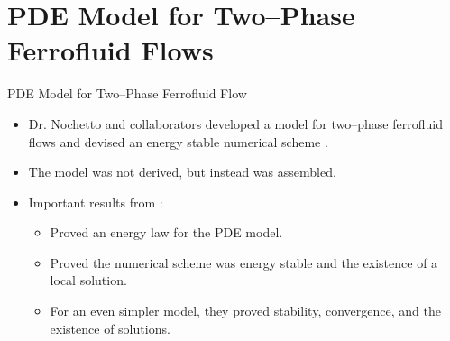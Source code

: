 \documentclass[9pt]{beamer}
\begin{document}
\section{PDE Model for Two--Phase Ferrofluid Flows}
\begin{frame}{PDE Model for Two--Phase Ferrofluid Flow}
	\begin{itemize}
		\item Dr. Nochetto and collaborators developed a model for two--phase ferrofluid flows and devised an energy stable numerical scheme \cite{DiffuseInterface}.
		\vspace{.1in}
		\item The model was not derived, but instead was assembled.
		\vspace{.1in}
		\item Important results from \cite{DiffuseInterface}:
		\begin{itemize}
			\item Proved an energy law for the PDE model.
			\item Proved the numerical scheme was energy stable and the existence of a local solution.
			\item For an even simpler model, they proved stability, convergence, and the existence of solutions.
		\end{itemize}
	\end{itemize}
\end{frame}
\end{document}
